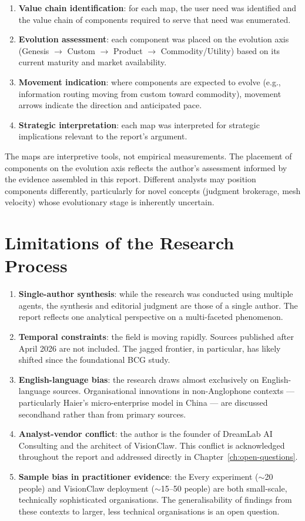 \begin{enumerate}
  \item \textbf{Value chain identification}: for each map, the user need was identified and the value chain of components required to serve that need was enumerated.
  \item \textbf{Evolution assessment}: each component was placed on the evolution axis (Genesis $\rightarrow$ Custom $\rightarrow$ Product $\rightarrow$ Commodity/Utility) based on its current maturity and market availability.
  \item \textbf{Movement indication}: where components are expected to evolve (e.g., information routing moving from custom toward commodity), movement arrows indicate the direction and anticipated pace.
  \item \textbf{Strategic interpretation}: each map was interpreted for strategic implications relevant to the report's argument.
\end{enumerate}

The maps are interpretive tools, not empirical measurements. The placement of components on the evolution axis reflects the author's assessment informed by the evidence assembled in this report. Different analysts may position components differently, particularly for novel concepts (judgment brokerage, mesh velocity) whose evolutionary stage is inherently uncertain.

\section{Limitations of the Research Process}

\begin{enumerate}
  \item \textbf{Single-author synthesis}: while the research was conducted using multiple agents, the synthesis and editorial judgment are those of a single author. The report reflects one analytical perspective on a multi-faceted phenomenon.
  \item \textbf{Temporal constraints}: the field is moving rapidly. Sources published after April 2026 are not included. The jagged frontier, in particular, has likely shifted since the foundational BCG study.
  \item \textbf{English-language bias}: the research draws almost exclusively on English-language sources. Organisational innovations in non-Anglophone contexts --- particularly Haier's micro-enterprise model in China --- are discussed secondhand rather than from primary sources.
  \item \textbf{Analyst-vendor conflict}: the author is the founder of DreamLab AI Consulting and the architect of VisionClaw. This conflict is acknowledged throughout the report and addressed directly in Chapter~\ref{ch:open-questions}.
  \item \textbf{Sample bias in practitioner evidence}: the Every experiment ($\sim$20 people) and VisionClaw deployment ($\sim$15--50 people) are both small-scale, technically sophisticated organisations. The generalisability of findings from these contexts to larger, less technical organisations is an open question.
\end{enumerate}

